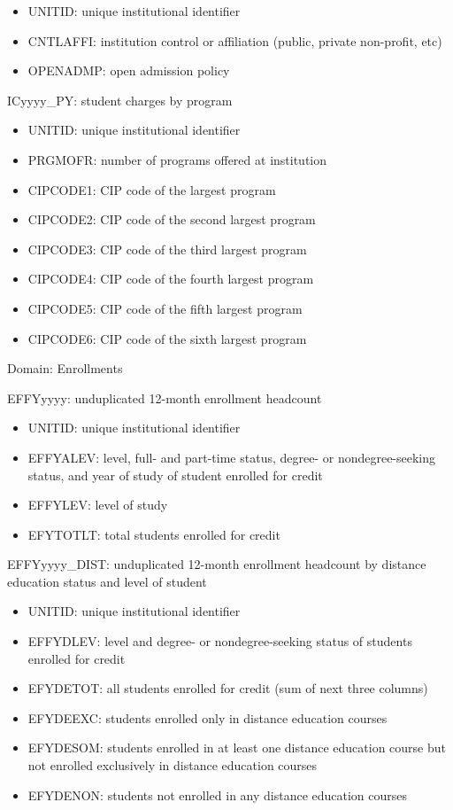 \documentclass[sigconf, authorversion, nonacm]{acmart}
\begin{document}
    \begin{itemize}
        \item UNITID: unique institutional identifier
        \item CNTLAFFI: institution control or affiliation (public, private non-profit, etc)
        \item OPENADMP: open admission policy
    \end{itemize}

    ICyyyy_PY: student charges by program

    \begin{itemize}
        \item UNITID: unique institutional identifier
        \item PRGMOFR: number of programs offered at institution
        \item CIPCODE1: CIP code of the largest program
        \item CIPCODE2: CIP code of the second largest program
        \item CIPCODE3: CIP code of the third largest program
        \item CIPCODE4: CIP code of the fourth largest program
        \item CIPCODE5: CIP code of the fifth largest program
        \item CIPCODE6: CIP code of the sixth largest program
    \end{itemize}

    Domain: Enrollments

    EFFYyyyy: unduplicated 12-month enrollment headcount

    \begin{itemize}
        \item UNITID: unique institutional identifier
        \item EFFYALEV: level, full- and part-time status, degree- or nondegree-seeking status, and year of study of student enrolled for credit
        \item EFFYLEV: level of study
        \item EFYTOTLT: total students enrolled for credit
    \end{itemize}

    EFFYyyyy_DIST: unduplicated 12-month enrollment headcount by distance education status and level of student

    \begin{itemize}
        \item UNITID: unique institutional identifier
        \item EFFYDLEV: level and degree- or nondegree-seeking status of students enrolled for credit
        \item EFYDETOT: all students enrolled for credit (sum of next three columns)
        \item EFYDEEXC: students enrolled only in distance education courses
        \item EFYDESOM: students enrolled in at least one distance education course but not enrolled exclusively in distance education courses
        \item EFYDENON: students not enrolled in any distance education courses
    \end{itemize}
\end{document}
